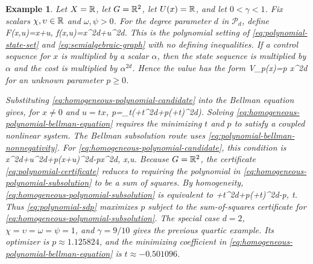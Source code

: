 \documentclass{article}
\newtheorem{example}{Example}
\begin{document}
\begin{example}
Let $X=\mathbb{R}$, let $G=\mathbb{R}^2$, let $U(x)=\mathbb{R}$, and let $0<\gamma<1$. Fix scalars $\chi,\upsilon\in\mathbb{R}$ and $\omega,\psi>0$. For the degree parameter $d$ in $\mathcal P_d$, define
\BEQ
F(x,u)=\chi x+\upsilon u,
\qquad
f(x,u)=\omega x^{2d}+\psi u^{2d}.
\label{eq:homogeneous-polynomial-class}
\EEQ
This is the polynomial setting of \eqref{eq:polynomial-state-set} and \eqref{eq:semialgebraic-graph} with no defining inequalities. If a control sequence for $x$ is multiplied by a scalar $\alpha$, then the state sequence is multiplied by $\alpha$ and the cost is multiplied by $\alpha^{2d}$. Hence the value has the form
\BEQ
V_p(x)=p x^{2d}
\label{eq:homogeneous-polynomial-candidate}
\EEQ
for an unknown parameter $p\geq0$.

Substituting \eqref{eq:homogeneous-polynomial-candidate} into the Bellman equation gives, for $x\neq0$ and $u=tx$,
\BEQ
p=\min_{t\in\reals}\left(\omega+\psi t^{2d}+\gamma p(\chi+\upsilon t)^{2d}\right).
\label{eq:homogeneous-polynomial-bellman-equation}
\EEQ
Solving \eqref{eq:homogeneous-polynomial-bellman-equation} requires the minimizing $t$ and $p$ to satisfy a coupled nonlinear system. The Bellman subsolution route uses \eqref{eq:polynomial-bellman-nonnegativity}. For \eqref{eq:homogeneous-polynomial-candidate}, this condition is
\BEQ
\omega x^{2d}+\psi u^{2d}+\gamma p(\chi x+\upsilon u)^{2d}-px^{2d},
\quad x,u\in\reals.
\label{eq:homogeneous-polynomial-subsolution}
\EEQ
Because $G=\mathbb{R}^2$, the certificate \eqref{eq:polynomial-certificate} reduces to requiring the polynomial in \eqref{eq:homogeneous-polynomial-subsolution} to be a sum of squares. By homogeneity, \eqref{eq:homogeneous-polynomial-subsolution} is equivalent to
\BEQ
\omega+\psi t^{2d}+\gamma p(\chi+\upsilon t)^{2d}-p,
\quad t\in\reals.
\label{eq:homogeneous-polynomial-univariate}
\EEQ
Thus \eqref{eq:polynomial-sdp} maximizes $p$ subject to the sum-of-squares certificate for \eqref{eq:homogeneous-polynomial-subsolution}. The special case $d=2$, $\chi=\upsilon=\omega=\psi=1$, and $\gamma=9/10$ gives the previous quartic example. Its optimizer is $p\approx1.125824$, and the minimizing coefficient in \eqref{eq:homogeneous-polynomial-bellman-equation} is $t\approx -0.501096$.
\end{example}
\end{document}
